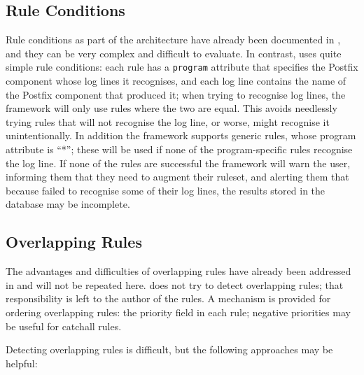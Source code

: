 \subsection{Rule Conditions}

\label{rule conditions in implementation}

Rule conditions as part of the architecture have already been documented in
, and they can be very complex
and difficult to evaluate.  In contrast, \parsername{} uses quite simple
rule conditions: each rule has a \texttt{program} attribute that specifies
the Postfix component whose log lines it recognises, and each log line
contains the name of the Postfix component that produced it; when trying to
recognise log lines, the framework will only use rules where the two are
equal.  This avoids needlessly trying rules that will not recognise the log
line, or worse, might recognise it unintentionally.  In addition the
framework supports generic rules, whose program attribute is ``*''; these
will be used if none of the program-specific rules recognise the log line.
If none of the rules are successful the framework will warn the user,
informing them that they need to augment their ruleset, and alerting them
that because \parsername{} failed to recognise some of their log lines, the
results stored in the database may be incomplete.

\subsection{Overlapping Rules}

\label{overlapping rules in implementation}

The advantages and difficulties of overlapping rules have already been
addressed in  and will not be
repeated here.  \parsername{} does not try to detect overlapping rules;
that responsibility is left to the author of the rules.  A mechanism is
provided for ordering overlapping rules: the priority field in each rule;
negative priorities may be useful for catchall rules.

Detecting overlapping rules is difficult, but the following approaches may
be helpful:

